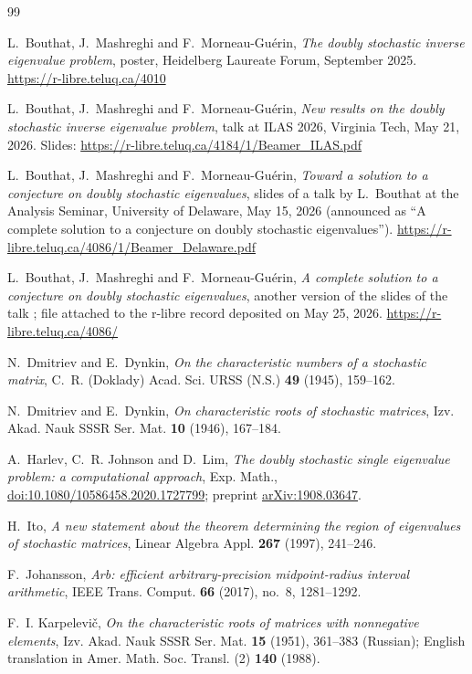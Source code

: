 \documentclass[11pt]{amsart}
\theoremstyle{definition}
\theoremstyle{remark}
\begin{document}
\begin{thebibliography}{99}

L.~Bouthat, J.~Mashreghi and F.~Morneau-Guérin, \emph{The doubly stochastic inverse eigenvalue problem}, poster, Heidelberg Laureate Forum, September 2025. \url{https://r-libre.teluq.ca/4010}

L.~Bouthat, J.~Mashreghi and F.~Morneau-Guérin, \emph{New results on the doubly stochastic inverse eigenvalue problem}, talk at ILAS 2026, Virginia Tech, May 21, 2026. Slides: \url{https://r-libre.teluq.ca/4184/1/Beamer_ILAS.pdf}

L.~Bouthat, J.~Mashreghi and F.~Morneau-Guérin, \emph{Toward a solution to a conjecture on doubly stochastic eigenvalues}, slides of a talk by L.~Bouthat at the Analysis Seminar, University of Delaware, May 15, 2026 (announced as ``A complete solution to a conjecture on doubly stochastic eigenvalues''). \url{https://r-libre.teluq.ca/4086/1/Beamer_Delaware.pdf}

L.~Bouthat, J.~Mashreghi and F.~Morneau-Guérin, \emph{A complete solution to a conjecture on doubly stochastic eigenvalues}, another version of the slides of the talk \cite{Bou26}; file attached to the r-libre record deposited on May 25, 2026. \url{https://r-libre.teluq.ca/4086/}

N.~Dmitriev and E.~Dynkin, \emph{On the characteristic numbers of a stochastic matrix}, C.~R. (Doklady) Acad. Sci. URSS (N.S.) \textbf{49} (1945), 159--162.

N.~Dmitriev and E.~Dynkin, \emph{On characteristic roots of stochastic matrices}, Izv. Akad. Nauk SSSR Ser. Mat. \textbf{10} (1946), 167--184.

A.~Harlev, C.~R. Johnson and D.~Lim, \emph{The doubly stochastic single eigenvalue problem: a computational approach}, Exp. Math., \href{https://doi.org/10.1080/10586458.2020.1727799}{doi:10.1080/10586458.2020.1727799}; preprint \href{https://arxiv.org/abs/1908.03647}{arXiv:1908.03647}.

H.~Ito, \emph{A new statement about the theorem determining the region of eigenvalues of stochastic matrices}, Linear Algebra Appl. \textbf{267} (1997), 241--246.

F.~Johansson, \emph{Arb: efficient arbitrary-precision midpoint-radius interval arithmetic}, IEEE Trans. Comput. \textbf{66} (2017), no.~8, 1281--1292.

F.~I. Karpelevi\v{c}, \emph{On the characteristic roots of matrices with nonnegative elements}, Izv. Akad. Nauk SSSR Ser. Mat. \textbf{15} (1951), 361--383 (Russian); English translation in Amer. Math. Soc. Transl. (2) \textbf{140} (1988).


\end{thebibliography}
\end{document}
